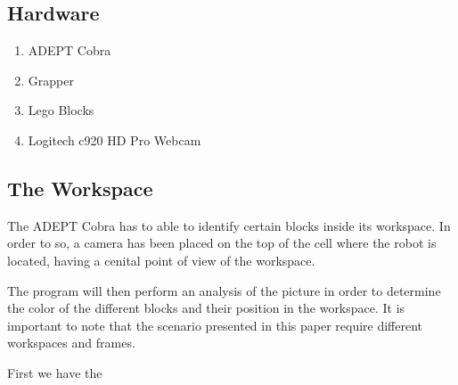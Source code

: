 \subsection*{Hardware}
\begin{enumerate}
	\item ADEPT Cobra
	\item Grapper
	\item Lego Blocks
	\item Logitech c920 HD Pro Webcam
\end{enumerate}

\subsection*{The Workspace} The ADEPT Cobra has to able to identify certain blocks inside its workspace. In order to so, a camera has been placed on the top of the cell where the robot is located, having a cenital point of view of the workspace.

The program will then perform an analysis of the picture in order to determine the color of the different blocks and their position in the workspace.
It is important to note that the scenario presented in this paper require different workspaces and frames.

First we have the 



